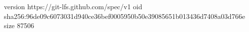 version https://git-lfs.github.com/spec/v1
oid sha256:96de09c6073031d940ce36bef0005950b50e39085651b013436d7408a03d766e
size 87506

